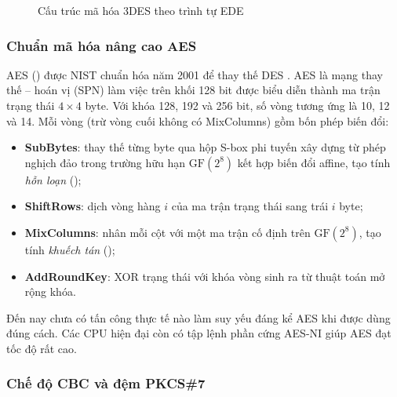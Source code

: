 \begin{figure}[H]
\centering
{}
\caption{Cấu trúc mã hóa 3DES theo trình tự EDE}
\label{fig:3des}
\end{figure}

\subsubsection{Chuẩn mã hóa nâng cao AES}

AES () được NIST chuẩn hóa năm 2001 để thay thế DES
\cite{fips197, daemen2002}. AES là mạng thay thế -- hoán vị (SPN) làm việc trên khối 128 bit được
biểu diễn thành ma trận trạng thái $4\times4$ byte. Với khóa 128, 192 và 256 bit, số vòng tương ứng
là 10, 12 và 14. Mỗi vòng (trừ vòng cuối không có MixColumns) gồm bốn phép biến đổi:
\begin{itemize}
  \item \textbf{SubBytes}: thay thế từng byte qua hộp S-box phi tuyến xây dựng từ phép nghịch đảo
        trong trường hữu hạn $\mathrm{GF}(2^8)$ kết hợp biến đổi affine, tạo tính \emph{hỗn loạn}
        ();
  \item \textbf{ShiftRows}: dịch vòng hàng $i$ của ma trận trạng thái sang trái $i$ byte;
  \item \textbf{MixColumns}: nhân mỗi cột với một ma trận cố định trên $\mathrm{GF}(2^8)$, tạo tính
        \emph{khuếch tán} ();
  \item \textbf{AddRoundKey}: XOR trạng thái với khóa vòng sinh ra từ thuật toán mở rộng khóa.
\end{itemize}
Đến nay chưa có tấn công thực tế nào làm suy yếu đáng kể AES khi được dùng đúng cách. Các CPU
hiện đại còn có tập lệnh phần cứng AES-NI giúp AES đạt tốc độ rất cao.

\subsubsection{Chế độ CBC và đệm PKCS\#7}

